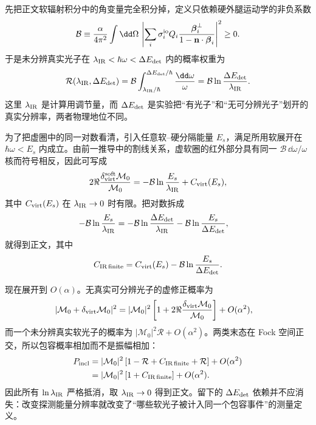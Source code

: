 \begin{derivation}[软光子实虚抵消与有限分辨率]
先把正文软辐射积分中的角变量完全积分掉，定义只依赖硬外腿运动学的非负系数
\begin{equation*}
 \mathcal B
 \equiv\frac{\alpha}{4\pi^2}
 \int\dd\Omega\,
 \left|
 \sum_i\sigma_i^{\rm io}Q_i
 \frac{\boldsymbol\beta_i^\perp}
 {1-\mathbf n\cdot\boldsymbol\beta_i}
 \right|^2\ge0.
\end{equation*}
于是未分辨真实光子在
$\lambda_{\rm IR}<\hbar\omega<\Delta E_{\rm det}$ 内的概率权重为
\begin{equation*}
 \mathcal R(\lambda_{\rm IR},\Delta E_{\rm det})
 =\mathcal B\int_{\lambda_{\rm IR}/\hbar}^{\Delta E_{\rm det}/\hbar}
 \frac{\dd\omega}{\omega}
 =\mathcal B\ln\frac{\Delta E_{\rm det}}{\lambda_{\rm IR}}.
\end{equation*}
这里 $\lambda_{\rm IR}$ 是计算用调节量，而 $\Delta E_{\rm det}$ 是实验把“有光子”和“无可分辨光子”划开的真实分辨率，两者物理地位不同。

为了把虚圈中的同一对数看清，引入任意软--硬分隔能量 $E_s$，满足所用软展开在
$\hbar\omega<E_s$ 内成立。由前一推导中的割线关系，虚软圈的红外部分具有同一 $\mathcal B\,\dd\omega/\omega$ 核而符号相反，因此可写成
\begin{equation*}
 2\Re\frac{\delta_{\rm virt}^{\rm soft}\mathcal M_0}{\mathcal M_0}
 =-\mathcal B\ln\frac{E_s}{\lambda_{\rm IR}}
 +C_{\rm virt}(E_s),
\end{equation*}
其中 $C_{\rm virt}(E_s)$ 在 $\lambda_{\rm IR}\to0$ 时有限。把对数拆成
\begin{align*}
 -\mathcal B\ln\frac{E_s}{\lambda_{\rm IR}}
 &=-\mathcal B\ln\frac{\Delta E_{\rm det}}{\lambda_{\rm IR}}
   -\mathcal B\ln\frac{E_s}{\Delta E_{\rm det}},
\end{align*}
就得到正文，其中
\[
 C_{\rm IR\,finite}
 =C_{\rm virt}(E_s)-\mathcal B\ln\frac{E_s}{\Delta E_{\rm det}}.
\]

现在展开到 $O(\alpha)$。无真实可分辨光子的虚修正概率为
\begin{align*}
 |\mathcal M_0+\delta_{\rm virt}\mathcal M_0|^2
 &=|\mathcal M_0|^2
 \left[1+2\Re\frac{\delta_{\rm virt}\mathcal M_0}{\mathcal M_0}\right]
 +O(\alpha^2),
\end{align*}
而一个未分辨真实软光子的概率为
$|\mathcal M_0|^2\mathcal R+O(\alpha^2)$。两类末态在 Fock 空间正交，所以包容概率相加而不是振幅相加：
\begin{align*}
 P_{\rm incl}
 &=|\mathcal M_0|^2
 \left[
 1-\mathcal R+C_{\rm IR\,finite}+\mathcal R
 \right]+O(\alpha^2)\\
 &=|\mathcal M_0|^2
 \left[1+C_{\rm IR\,finite}\right]+O(\alpha^2).
\end{align*}
因此所有 $\ln\lambda_{\rm IR}$ 严格抵消，取
$\lambda_{\rm IR}\to0$ 得到正文。留下的
$\Delta E_{\rm det}$ 依赖并不应消失：改变探测能量分辨率就改变了“哪些软光子被计入同一个包容事件”的测量定义。
\end{derivation}

